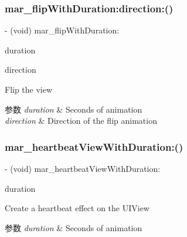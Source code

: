 \subsubsection{\texorpdfstring{mar\+\_\+flip\+With\+Duration\+:direction\+:()}{mar\_flipWithDuration:direction:()}}
{\footnotesize\ttfamily -\/ (void) mar\+\_\+flip\+With\+Duration\+: \begin{DoxyParamCaption}\item[{(N\+S\+Time\+Interval)}]{duration }\item[{direction:(M\+A\+R\+U\+I\+View\+Animation\+Flip\+Direction)}]{direction }\end{DoxyParamCaption}}

Flip the view


\begin{DoxyParams}{参数}
{\em duration} & Seconds of animation \\
\hline
{\em direction} & Direction of the flip animation \\
\hline
\end{DoxyParams}
\mbox{\label{category_u_i_view_07_m_a_r_e_x___animation_08_a35f9de4de9b4bf16aef68b5e8d29dcff}} 
\subsubsection{\texorpdfstring{mar\+\_\+heartbeat\+View\+With\+Duration\+:()}{mar\_heartbeatViewWithDuration:()}}
{\footnotesize\ttfamily -\/ (void) mar\+\_\+heartbeat\+View\+With\+Duration\+: \begin{DoxyParamCaption}\item[{(C\+G\+Float)}]{duration }\end{DoxyParamCaption}}

Create a heartbeat effect on the U\+I\+View


\begin{DoxyParams}{参数}
{\em duration} & Seconds of animation \\
\hline
\end{DoxyParams}
\mbox{\label{category_u_i_view_07_m_a_r_e_x___animation_08_a48cc0e4fd10177664209962e11c194eb}} 
